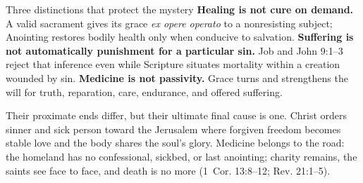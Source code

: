 \begin{studybox}{Three distinctions that protect the mystery}
\textbf{Healing is not cure on demand.} A valid sacrament gives its grace \emph{ex opere operato} to a nonresisting subject; Anointing restores bodily health only when conducive to salvation. \textbf{Suffering is not automatically punishment for a particular sin.} Job and John 9:1--3 reject that inference even while Scripture situates mortality within a creation wounded by sin. \textbf{Medicine is not passivity.} Grace turns and strengthens the will for truth, reparation, care, endurance, and offered suffering.
\end{studybox}

Their proximate ends differ, but their ultimate final cause is one. Christ orders sinner and sick person toward the Jerusalem where forgiven freedom becomes stable love and the body shares the soul's glory. Medicine belongs to the road: the homeland has no confessional, sickbed, or last anointing; charity remains, the saints see face to face, and death is no more (1~Cor. 13:8--12; Rev. 21:1--5).

\clearpage
